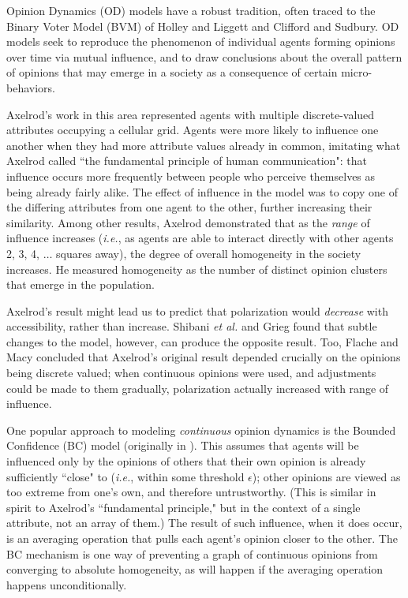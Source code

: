 
Opinion Dynamics (OD) models have a robust tradition, often traced to the
Binary Voter Model (BVM) of Holley and Liggett\cite{holley_ergodic_1975} and
Clifford and Sudbury\cite{clifford_model_1973}. OD models seek to reproduce
the phenomenon of individual agents forming opinions over time via mutual
influence, and to draw conclusions about the overall pattern of opinions that
may emerge in a society as a consequence of certain micro-behaviors.

Axelrod's work in this area\cite{axelrod_dissemination_1997} represented
agents with multiple discrete-valued attributes occupying a cellular grid.
Agents were more likely to influence one another when they had more attribute
values already in common, imitating what Axelrod called ``the fundamental
principle of human communication": that influence occurs more frequently
between people who perceive themselves as being already fairly alike. The
effect of influence in the model was to copy one of the differing attributes
from one agent to the other, further increasing their similarity. Among other
results, Axelrod demonstrated that as the \textit{range} of influence
increases (\textit{i.e.}, as agents are able to interact directly with other
agents 2, 3, 4, $\dots$ squares away), the degree of overall homogeneity in
the society increases. He measured homogeneity as the number of distinct
opinion clusters that emerge in the population.

Axelrod's result might lead us to predict that polarization would
\textit{decrease} with accessibility, rather than increase. Shibani \textit{et
al.}\cite{shibanai_effects_2001} and Grieg\cite{greig_end_2002} found that
subtle changes to the model, however, can produce the opposite result. Too,
Flache and Macy\cite{flache_why_2006} concluded that Axelrod's original result
depended crucially on the opinions being discrete valued; when continuous
opinions were used, and adjustments could be made to them gradually,
polarization actually increased with range of influence.

One popular approach to modeling \textit{continuous} opinion dynamics is the
Bounded Confidence (BC) model (originally in
\cite{deffuant_mixing_2000,hegselmann_opinion_2002}). This assumes that agents
will be influenced only by the opinions of others that their own opinion is
already sufficiently ``close" to (\textit{i.e.}, within some threshold
$\epsilon$); other opinions are viewed as too extreme from one's own, and
therefore untrustworthy. (This is similar in spirit to Axelrod's ``fundamental
principle," but in the context of a single attribute, not an array of them.)
The result of such influence, when it does occur, is an averaging operation
that pulls each agent's opinion closer to the other. The BC mechanism is one
way of preventing a graph of continuous opinions from converging to absolute
homogeneity, as will happen if the averaging operation happens
unconditionally.

